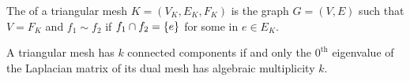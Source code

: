 \documentclass[11pt]{article}
\begin{document}
\begin{definition}
    The  of a triangular mesh $K = (V_K, E_K, F_K)$ is the graph $G = (V, E)$ such that $V = F_K$ and $f_1 \sim f_2$ if $f_1 \cap f_2 = \qty{e}$ for some in $e \in E_K$.
\end{definition}

\begin{theorem}
    A triangular mesh has $k$ connected components if and only the $0^\text{th}$ eigenvalue of the Laplacian matrix of its dual mesh has algebraic multiplicity $k$.
\end{theorem}

\newpage
\nocite{merrisLaplacianMatricesGraphs1994}
\printbibliography
\end{document}
